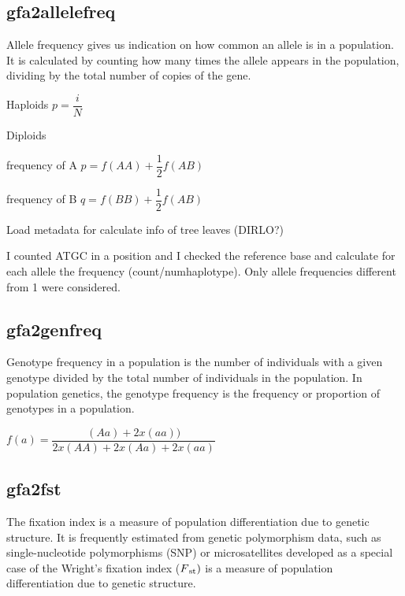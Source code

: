 \subsection{gfa2allelefreq} 

Allele frequency gives us indication on how common an allele is in a population. It is calculated by counting how many times the allele appears in the population, dividing by the total number of copies of the gene.

Haploids    $p = \dfrac{i}{N}$

Diploids   

frequency of A $p = {f(AA)} + \dfrac{1}{2} f(AB)$

frequency of B $q = {f(BB)} + \dfrac{1}{2} f(AB)$

Load metadata for calculate info of tree leaves (DIRLO?)

I counted ATGC in a position and I checked the reference base and calculate for each allele the frequency (count/numhaplotype).
Only allele frequencies different from 1 were considered. 
 



\subsection{gfa2genfreq}

Genotype frequency \cite{brooker2014principles} in a population is the number of individuals with a given genotype divided by the total number of individuals in the population. In population genetics, the genotype frequency is the frequency or proportion of genotypes in a population. 

$f(a) = \dfrac{(Aa) + 2 x (aa))}{2 x (AA) + 2 x (Aa) + 2 x (aa)}$





\subsection{gfa2fst}

The fixation index is a measure of population differentiation due to genetic structure. It is frequently estimated from genetic polymorphism data, such as single-nucleotide polymorphisms (SNP) or microsatellites developed as a special case of
the Wright’s fixation index ($F\textsubscript{st})$ is a measure of population differentiation due to genetic structure. 

